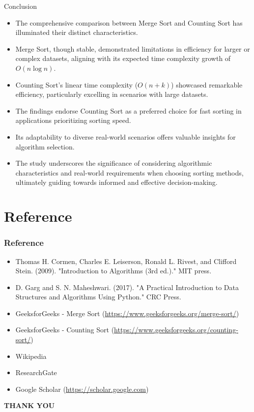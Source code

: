 \documentclass{beamer}
\begin{document}
	\begin{frame}{Conclusion}
		\begin{itemize}
			\item The comprehensive comparison between Merge Sort and Counting Sort has illuminated their distinct characteristics.
			\item Merge Sort, though stable, demonstrated limitations in efficiency for larger or complex datasets, aligning with its expected time complexity growth of \(O(n \log n)\).
			\item Counting Sort's linear time complexity (\(O(n + k)\)) showcased remarkable efficiency, particularly excelling in scenarios with large datasets.
		\end{itemize}
		
		
		\begin{itemize}
			\item The findings endorse Counting Sort as a preferred choice for fast sorting in applications prioritizing sorting speed.
			\item Its adaptability to diverse real-world scenarios offers valuable insights for algorithm selection.
			\item The study underscores the significance of considering algorithmic characteristics and real-world requirements when choosing sorting methods, ultimately guiding towards informed and effective decision-making.
		\end{itemize}
	\end{frame}
	
	\section{Reference}
	\begin{frame}
		\frametitle{Reference}
		
		\begin{itemize}
			\item Thomas H. Cormen, Charles E. Leiserson, Ronald L. Rivest, and Clifford Stein. (2009). "Introduction to Algorithms (3rd ed.)." MIT press.
			\item D. Garg and S. N. Maheshwari. (2017). "A Practical Introduction to Data Structures and Algorithms Using Python." CRC Press.
			\item GeeksforGeeks - Merge Sort (\url{https://www.geeksforgeeks.org/merge-sort/})
			\item GeeksforGeeks - Counting Sort (\url{https://www.geeksforgeeks.org/counting-sort/})
			\item Wikipedia
			\item ResearchGate
			\item Google Scholar (\url{https://scholar.google.com})
		\end{itemize}
	\end{frame}
	
		
	\begin{frame}
		\begin{center}
			
			\textbf{THANK YOU}
		\end{center}    
	\end{frame}
\end{document}

